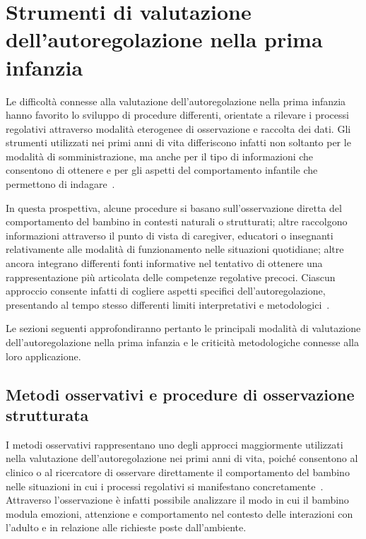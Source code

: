     \section{Strumenti di valutazione dell'autoregolazione nella prima infanzia}
    \label{sec:3_5}

        Le difficoltà connesse alla valutazione dell'autoregolazione nella prima infanzia hanno favorito lo sviluppo di procedure differenti, orientate a rilevare i processi regolativi attraverso modalità eterogenee di osservazione e raccolta dei dati. Gli strumenti utilizzati nei primi anni di vita differiscono infatti non soltanto per le modalità di somministrazione, ma anche per il tipo di informazioni che consentono di ottenere e per gli aspetti del comportamento infantile che permettono di indagare~\cite{berni2025,toplak2013}.

        In questa prospettiva, alcune procedure si basano sull'osservazione diretta del comportamento del bambino in contesti naturali o strutturati; altre raccolgono informazioni attraverso il punto di vista di caregiver, educatori o insegnanti relativamente alle modalità di funzionamento nelle situazioni quotidiane; altre ancora integrano differenti fonti informative nel tentativo di ottenere una rappresentazione più articolata delle competenze regolative precoci. Ciascun approccio consente infatti di cogliere aspetti specifici dell'autoregolazione, presentando al tempo stesso differenti limiti interpretativi e metodologici~\cite{toplak2013}.

        Le sezioni seguenti approfondiranno pertanto le principali modalità di valutazione dell'autoregolazione nella prima infanzia e le criticità metodologiche connesse alla loro applicazione.

        \subsection{Metodi osservativi e procedure di osservazione strutturata}
        \label{sec:3_5_1}

            I metodi osservativi rappresentano uno degli approcci maggiormente utilizzati nella valutazione dell'autoregolazione nei primi anni di vita, poiché consentono al clinico o al ricercatore di osservare direttamente il comportamento del bambino nelle situazioni in cui i processi regolativi si manifestano concretamente~\cite{calkins2007,mcclelland2012}. Attraverso l'osservazione è infatti possibile analizzare il modo in cui il bambino modula emozioni, attenzione e comportamento nel contesto delle interazioni con l'adulto e in relazione alle richieste poste dall'ambiente.

